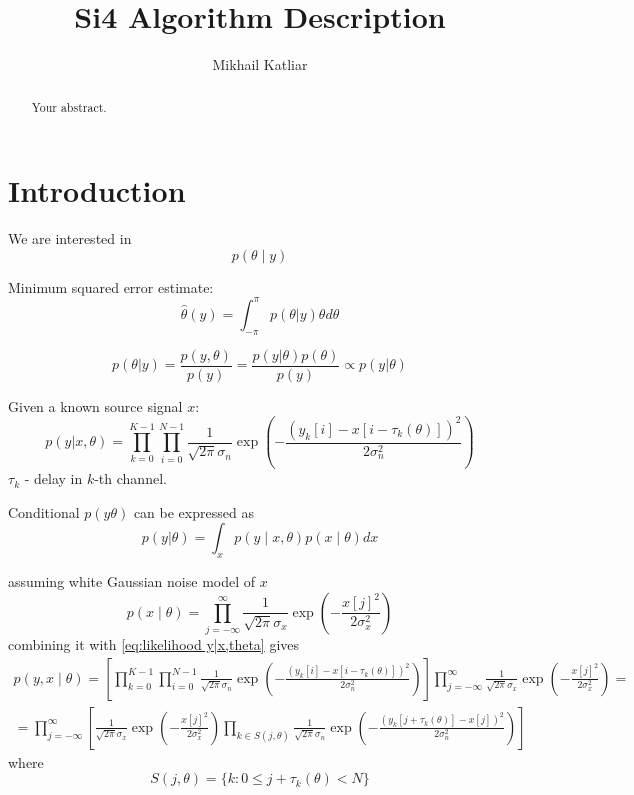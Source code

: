 \documentclass[a4paper]{article}
\title{Si4 Algorithm Description}
\author{Mikhail Katliar}
\begin{document}
\maketitle
\begin{abstract}
Your abstract.
\end{abstract}

\section{Introduction}

We are interested in
$$
p(\theta \mid y)
$$

Minimum squared error estimate:
$$
\hat{\theta}(y) = \int_{-\pi}^\pi p(\theta | y) \theta d \theta
$$

$$
p(\theta | y) = \frac{p(y, \theta)}{p(y)} = \frac{p(y| \theta) p(\theta)}{p(y)} \propto p(y| \theta)
$$

Given a known source signal $x$:
\begin{equation}
p(y | x, \theta) = \prod_{k=0}^{K-1}\prod_{i=0}^{N-1} \frac{1}{\sqrt{2\pi} \sigma_n} \exp\left(-\frac{(y_k[i] - x[i - \tau_k(\theta)])^2}{2\sigma_n^2}\right)
\label{eq:likelihood y|x,theta}
\end{equation}
$\tau_k$ - delay in $k$-th channel.

Conditional $p(y\theta)$ can be expressed as
$$
p(y|\theta) = \int_x p(y \mid x, \theta) p(x \mid \theta) dx
$$

assuming white Gaussian noise model of $x$
$$
p(x \mid \theta) = \prod_{j=-\infty}^\infty \frac{1}{\sqrt{2\pi}\sigma_x} \exp\left(-\frac{x[j]^2}{2\sigma_x^2}\right)
$$
combining it with \eqref{eq:likelihood y|x,theta} gives
\begin{multline}
p(y, x \mid \theta)=\left[\prod_{k=0}^{K-1}\prod_{i=0}^{N-1} \frac{1}{\sqrt{2\pi} \sigma_n} \exp\left(-\frac{(y_k[i] - x[i - \tau_k(\theta)])^2}{2\sigma_n^2}\right)\right] \prod_{j=-\infty}^\infty \frac{1}{\sqrt{2\pi}\sigma_x} \exp\left(-\frac{x[j]^2}{2\sigma_x^2}\right) = \\
= \prod_{j=-\infty}^\infty \left[ \frac{1}{\sqrt{2\pi}\sigma_x} \exp\left(-\frac{x[j]^2}{2\sigma_x^2}\right) \prod_{k \in S(j,\theta)} \frac{1}{\sqrt{2\pi} \sigma_n} \exp\left(-\frac{(y_k[j+\tau_k(\theta)] - x[j])^2}{2\sigma_n^2}\right) \right]
\end{multline}
where
$$
S(j,\theta) = \{k : 0 \leq j+\tau_k(\theta) < N\}
$$
\end{document}
